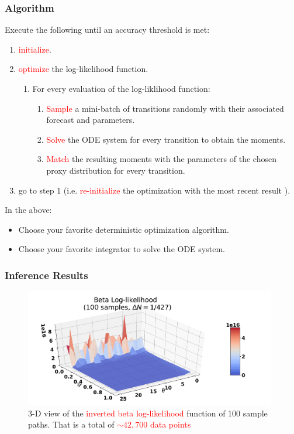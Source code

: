 \documentclass[aspectratio=169]{beamer}\usepackage[utf8]{inputenc}
\begin{document}
\begin{frame}\frametitle{Algorithm}

Execute the following until an accuracy threshold is met:
\begin{enumerate}
\item \textcolor{red}{initialize}.
\item \textcolor{red}{optimize} the log-likelihood function.
\begin{enumerate}
\item For every evaluation of the log-liklihood function:
\begin{enumerate}
  \item \textcolor{red}{Sample} a mini-batch of transitions randomly with their associated forecast and parameters.
  \item \textcolor{red}{Solve} the ODE system for every transition to obtain the moments.
  \item \textcolor{red}{Match} the resulting moments with the parameters of the chosen proxy distribution for every transition.
\end{enumerate}
\end{enumerate}
\item go to step 1 (i.e. \textcolor{red}{re-initialize} the optimization with the most recent result ).
\end{enumerate}

In the above:
\begin{itemize}
\item Choose your favorite deterministic optimization algorithm.
\item Choose your favorite integrator to solve the ODE system.
\end{itemize}
\end{frame}

\begin{frame}\frametitle{Inference Results}

\begin{figure}
  \includegraphics[width=110mm,scale=1]{plots/beta_likeli_3d.pdf}
  \caption{3-D view of the \textcolor{red}{inverted beta log-likelihood}  function of 100 sample paths. That is a total of  \textcolor{red}{ $\sim 42,700$ data points }}
\end{figure}
\end{frame}
\end{document}
